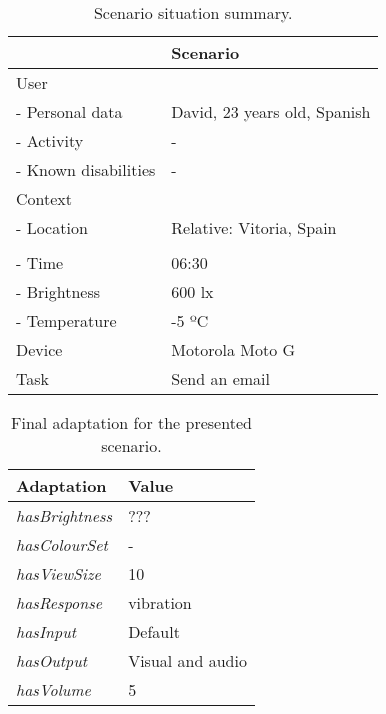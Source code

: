 \begin{table}
 \caption{Scenario situation summary.}
 \label{tbl:polisher_scenario}
 \footnotesize
 \centering
\begin{tabular}{l l}
  \hline 
				& \textbf{Scenario}		\\
  \hline
  User \\
  \qquad - Personal data 	& David, 23 years old, Spanish 	\\
  \qquad - Activity	 	& - 				\\
  \qquad - Known disabilities 	& - 				\\
  Context \\
  \qquad - Location 		& Relative: Vitoria, Spain  	\\
				& 				\\
  \qquad - Time			& 06:30 			\\
  \qquad - Brightness		& 600 \ac{lx} 			\\
  \qquad - Temperature		& -5 ºC 			\\
  Device 			& Motorola Moto G 	 	\\
  \hline
  Task				& Send an email			\\
  \hline
\end{tabular}
\end{table}

\begin{table}
 \caption{Final adaptation for the presented scenario.}
 \label{tbl:polisher_adaptation}
 \footnotesize
 \centering
\begin{tabular}{l l}
  \hline 
    \textbf{Adaptation} 	& \textbf{Value}\\
    \hline
    \textit{hasBrightness}	& ???		\\
    \textit{hasColourSet}	& -		\\
    \textit{hasViewSize}	& 10		\\
    \textit{hasResponse}	& vibration	\\
    \textit{hasInput}		& Default	\\
    \textit{hasOutput}		& Visual and audio\\
    \textit{hasVolume}		& 5 		\\
  \hline
\end{tabular}
\end{table}

